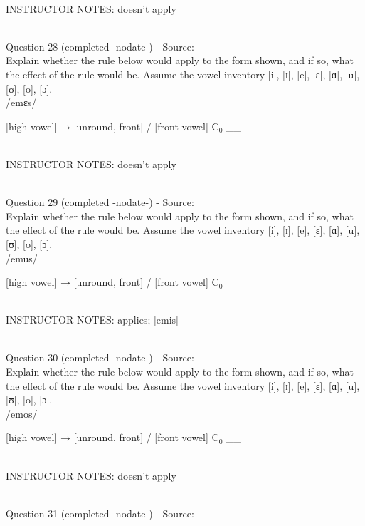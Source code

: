 \documentclass[12pt]{article}
\begin{document}
~\\
INSTRUCTOR NOTES: doesn't apply


~\\

{\large Question 28} (completed -nodate-) - Source: \\

Explain whether the rule below would apply to the form shown, and if so, what the effect of the rule would be. Assume the vowel inventory [i], [ɪ], [e], [ɛ], [ɑ], [u], [ʊ], [o], [ɔ].\\

/emɛs/

{[high vowel]} →  {[unround, front]} / {[front vowel]} C$_0$ \_\_ 


~\\
INSTRUCTOR NOTES: doesn't apply


~\\

{\large Question 29} (completed -nodate-) - Source: \\

Explain whether the rule below would apply to the form shown, and if so, what the effect of the rule would be. Assume the vowel inventory [i], [ɪ], [e], [ɛ], [ɑ], [u], [ʊ], [o], [ɔ].\\

/emus/

{[high vowel]} →  {[unround, front]} / {[front vowel]} C$_0$ \_\_ 


~\\
INSTRUCTOR NOTES: applies; [emis]


~\\

{\large Question 30} (completed -nodate-) - Source: \\

Explain whether the rule below would apply to the form shown, and if so, what the effect of the rule would be. Assume the vowel inventory [i], [ɪ], [e], [ɛ], [ɑ], [u], [ʊ], [o], [ɔ].\\

/emos/

{[high vowel]} →  {[unround, front]} / {[front vowel]} C$_0$ \_\_ 


~\\
INSTRUCTOR NOTES: doesn't apply


~\\

{\large Question 31} (completed -nodate-) - Source: \\
\end{document}
